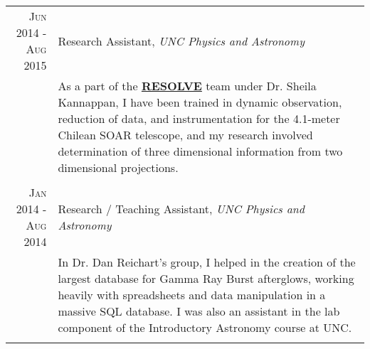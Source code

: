 \documentclass[a4paper,10pt]{article} %
\begin{document}
\begin{tabular}{r|p{11cm}}
\textsc{Jun 2014 - Aug 2015} & Research Assistant, \emph{UNC Physics and Astronomy} \\ 
& \footnotesize{As a part of the \textbf{\href{http://resolve.astro.unc.edu/}{RESOLVE}} team under Dr. Sheila Kannappan, I have been trained in dynamic observation, reduction of data, and instrumentation for the 4.1-meter Chilean SOAR telescope, and my research involved determination of three dimensional information from two dimensional projections.}\\
\multicolumn{2}{c}{} \\


\textsc{Jan 2014 - Aug 2014} & Research / Teaching Assistant, \emph{UNC Physics and Astronomy} \\ 
& \footnotesize{In Dr. Dan Reichart's group, I helped in the creation of the largest database for Gamma Ray Burst afterglows, working heavily with spreadsheets and data manipulation in a massive SQL database. I was also an assistant in the lab component of the Introductory Astronomy course at UNC.}\\
\multicolumn{2}{c}{} \\



\end{tabular}
\end{document}

